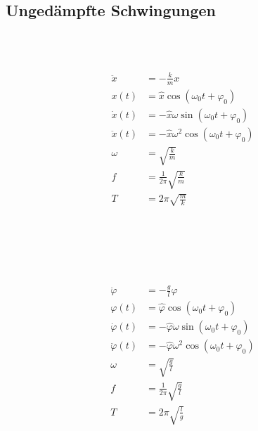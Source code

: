 \subsection{Ungedämpfte Schwingungen}

\begin{boxleft}
\\
\\
\end{boxleft}\begin{boxrightshaded}
\begin{align}
\ddot{x}&=-\frac{k}{m}x\\
x(t)&=\hat{x}\cos(\omega_0 t+\varphi_0)\\
\dot{x}(t)&=-\hat{x}\omega\sin(\omega_0 t+\varphi_0)\\
\ddot{x}(t)&=-\hat{x}\omega^2\cos(\omega_0 t+\varphi_0)\\
\omega&=\sqrt{\frac{k}{m}}\\
f&=\frac{1}{2\pi}\sqrt{\frac{k}{m}}\\
T&=2\pi\sqrt{\frac{m}{k}}
\end{align}
\end{boxrightshaded}

\begin{boxleft}
\\
\\
\\
\\
\end{boxleft}\begin{boxrightshaded}
\begin{align}
\ddot{\varphi}&=-\frac{g}{l}\varphi\\
\varphi(t)&=\hat{\varphi}\cos(\omega_0 t+\varphi_0)\\
\dot{\varphi}(t)&=-\hat{\varphi}\omega\sin(\omega_0 t+\varphi_0)\\
\ddot{\varphi}(t)&=-\hat{\varphi}\omega^2\cos(\omega_0 t+\varphi_0)\\
\omega&=\sqrt{\frac{g}{l}}\\
f&=\frac{1}{2\pi}\sqrt{\frac{g}{l}}\\
T&=2\pi\sqrt{\frac{l}{g}}
\end{align}
\end{boxrightshaded}

